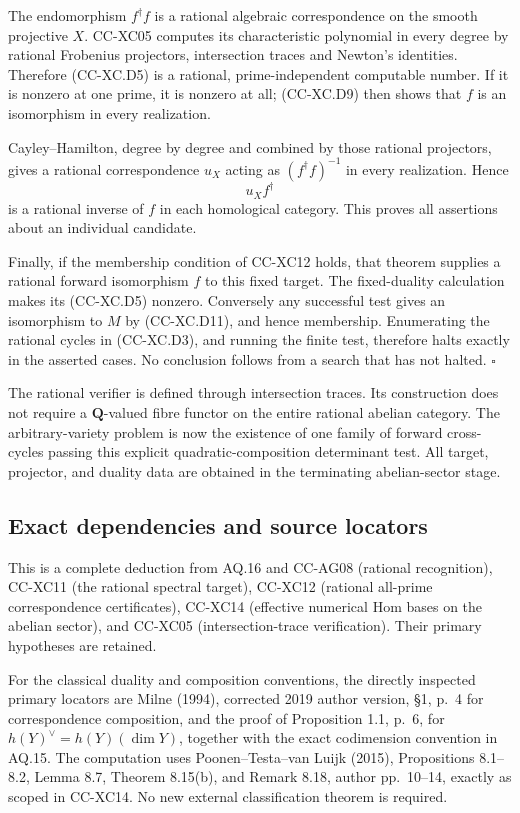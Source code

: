 The endomorphism \(f^\dagger f\) is a rational algebraic correspondence
on the smooth projective \(X\). CC-XC05 computes its characteristic
polynomial in every degree by rational Frobenius projectors,
intersection traces and Newton's identities. Therefore (CC-XC.D5) is a
rational, prime-independent computable number. If it is nonzero at one
prime, it is nonzero at all; (CC-XC.D9) then shows that \(f\) is an
isomorphism in every realization.

Cayley--Hamilton, degree by degree and combined by those rational
projectors, gives a rational correspondence \(u_X\) acting as
\((f^\dagger f)^{-1}\) in every realization. Hence \[
                             u_X f^\dagger              \tag{CC-XC.D11}
\] is a rational inverse of \(f\) in each homological category. This
proves all assertions about an individual candidate.

Finally, if the membership condition of CC-XC12 holds, that theorem
supplies a rational forward isomorphism \(f\) to this fixed target. The
fixed-duality calculation makes its (CC-XC.D5) nonzero. Conversely any
successful test gives an isomorphism to \(M\) by (CC-XC.D11), and hence
membership. Enumerating the rational cycles in (CC-XC.D3), and running
the finite test, therefore halts exactly in the asserted cases. No
conclusion follows from a search that has not halted. \(\square\)

The rational verifier is defined through intersection traces. Its
construction does not require a \(\mathbf Q\)-valued fibre functor on
the entire rational abelian category. The arbitrary-variety problem is
now the existence of one family of forward cross-cycles passing this
explicit quadratic-composition determinant test. All target, projector,
and duality data are obtained in the terminating abelian-sector stage.

\subsection{Exact dependencies and source
locators}\label{exact-dependencies-and-source-locators}

This is a complete deduction from AQ.16 and CC-AG08 (rational
recognition), CC-XC11 (the rational spectral target), CC-XC12 (rational
all-prime correspondence certificates), CC-XC14 (effective numerical Hom
bases on the abelian sector), and CC-XC05 (intersection-trace
verification). Their primary hypotheses are retained.

For the classical duality and composition conventions, the directly
inspected primary locators are Milne (1994), corrected 2019 author
version, §1, p.~4 for correspondence composition, and the proof of
Proposition 1.1, p.~6, for \(h(Y)^\vee=h(Y)(\dim Y)\), together with the
exact codimension convention in AQ.15. The computation uses
Poonen--Testa--van Luijk (2015), Propositions 8.1--8.2, Lemma 8.7,
Theorem 8.15(b), and Remark 8.18, author pp.~10--14, exactly as scoped
in CC-XC14. No new external classification theorem is required.


